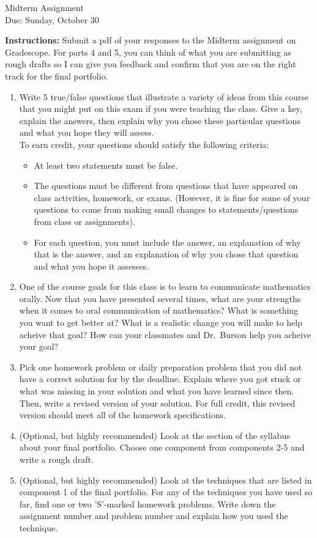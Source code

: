 \documentclass[12pt]{article}
\begin{document}
\begin{center}
{\Large Midterm Assignment}\\
Due: Sunday, October 30\\


\end{center}
{\bf Instructions:} Submit a pdf of your responses to the Midterm assignment on Gradescope.  For parts 4 and 5, you can think of what you are submitting as rough drafts so I can give you feedback and confirm that you are on the right track for the final portfolio. 


\begin{enumerate}
\item Write 5 true/false questions that illustrate a variety of ideas from this course that you might put on this exam if you were teaching the class. Give a key, explain the answers, then explain why you chose these particular questions and what you hope they will assess. \\
To earn credit, your questions should satisfy the following criteria:
\begin{itemize}
\item At least two statements must be false.
\item The questions must be different from questions that have appeared on class activities, homework, or exams. (However, it is fine for some of your questions to come from making small changes to statements/questions from class or assignments).
\item For each question, you must include the answer, an explanation of why that is the answer, and an explanation of why you chose that question and what you hope it assesses. 
\end{itemize} 
\item One of the course goals for this class is to learn to communicate mathematics orally. Now that you have presented several times, what are your strengths when it comes to oral communication of mathematics? What is something you want to get better at?  What is a realistic change you will make to help acheive that goal? How can your classmates and Dr.~Burson help you acheive your goal?
\item Pick one homework problem or daily preparation problem that you did not have a correct solution for by the deadline. Explain where you got stuck or what was missing in your solution and what you have learned since then. Then, write a revised version of your solution.  For full credit, this revised version should meet all of the homework specifications. 
\item (Optional, but highly recommended) Look at the section of the syllabus about your final portfolio. Choose one component from components 2-5 and write a rough draft. 
\item  (Optional, but highly recommended) Look at the techniques that are listed in component 1 of the final portfolio. For any of the techniques you have used so far, find one or two 'S'-marked homework problems. Write down the assignment number and problem number and explain how you used the technique. 

\end{enumerate}
\end{document}
